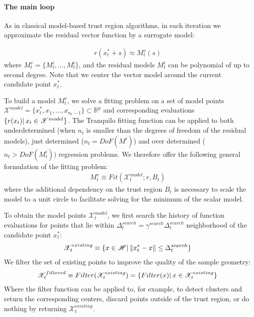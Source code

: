 \paragraph{The main loop} As in classical model-based trust region algorithms, in each iteration we approximate the residual vector function by a surrogate model:

\begin{align}
    r(x_t^*+s)\approx M_t^v(s)
    \label{eq:vec-model}
\end{align}
where $M_t^v = \{M_t^i,\dots,M_t^i\}$, and the residual models $M^i_t$ can be polynomial of up to second degree. Note that we center the vector model around the current candidate point $x_t^*$.


To build a model $M_t^v$, we solve a fitting problem on a set of model points $\mathcal{X}^{model}=\{x_t^*,x_1,\dots,x_{n_{t}-1}\}\subset\mathbb{R}^p$ and corresponding evaluations $\{r(x_t)|\hspace{0.2em} x_t\in\mathscr{X}^{model}\}$. The Tranquilo fitting function can be applied to both underdetermined (when $n_t$ is smaller than the degrees of freedom of the residual models), just determined ($n_t=DoF(M^i)$) and over determined ($n_t>DoF(M^i_t))$ regression problems. We therefore offer the following general formulation of the fitting problem:
\begin{align}
    M_t^v\equiv Fit(\mathcal{X}_t^{model};r,B_t)
    \label{eq:fit-model}
\end{align}
where the additional dependency on the trust region $B_t$ is necessary to scale the model to a unit circle to facilitate solving for the minimum of the scalar model.

To obtain the model points $\mathcal{X}^{model}_t$, we first search the history of function evaluations for points that lie within $\Delta_t^{search}=\gamma^{search}\Delta_t^{search}$ neighborhood of the candidate point $x_t^*$:
\begin{align}
    \mathscr{X}^{existing}_t\equiv\{x\in\mathscr{H}|\hspace{0.2em}\lVert x^*_t-x\rVert\leq\Delta^{search}_t\}
    \label{eq:hist-search}
\end{align}
We filter the set of existing points to improve the quality of the sample geometry:
\begin{align}
    \mathscr{X}^{filtered}_t\equiv Filter (\mathscr{X}^{existing}_t) = \{ Filter (x)|\hspace{0.2em} x\in \mathscr{X}^{existing}_t\}
    \label{eq:filtering}
\end{align}
Where the filter function can be applied to, for example, to detect clusters and return the corresponding centers, discard points outside of the trust region, or do nothing by returning $\mathcal{X}_t^{existing}$.

